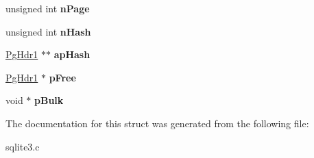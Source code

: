 \begin{DoxyCompactItemize}
\item 
unsigned int {\bfseries n\+Page}\hypertarget{structPCache1_ace332c276e28352992529f60f0ac457c}{}\label{structPCache1_ace332c276e28352992529f60f0ac457c}

\item 
unsigned int {\bfseries n\+Hash}\hypertarget{structPCache1_a09d9488a8a3a52822e33dd43e14c69e1}{}\label{structPCache1_a09d9488a8a3a52822e33dd43e14c69e1}

\item 
\hyperlink{structPgHdr1}{Pg\+Hdr1} $\ast$$\ast$ {\bfseries ap\+Hash}\hypertarget{structPCache1_a1169ec7ba2a628d89841d16ced651e1f}{}\label{structPCache1_a1169ec7ba2a628d89841d16ced651e1f}

\item 
\hyperlink{structPgHdr1}{Pg\+Hdr1} $\ast$ {\bfseries p\+Free}\hypertarget{structPCache1_a91dcc2d2771fa17cf065a1f9ff427d5f}{}\label{structPCache1_a91dcc2d2771fa17cf065a1f9ff427d5f}

\item 
void $\ast$ {\bfseries p\+Bulk}\hypertarget{structPCache1_a32591cc3f60587a1422627a080109fb7}{}\label{structPCache1_a32591cc3f60587a1422627a080109fb7}

\end{DoxyCompactItemize}


The documentation for this struct was generated from the following file\+:\begin{DoxyCompactItemize}
\item 
sqlite3.\+c\end{DoxyCompactItemize}
